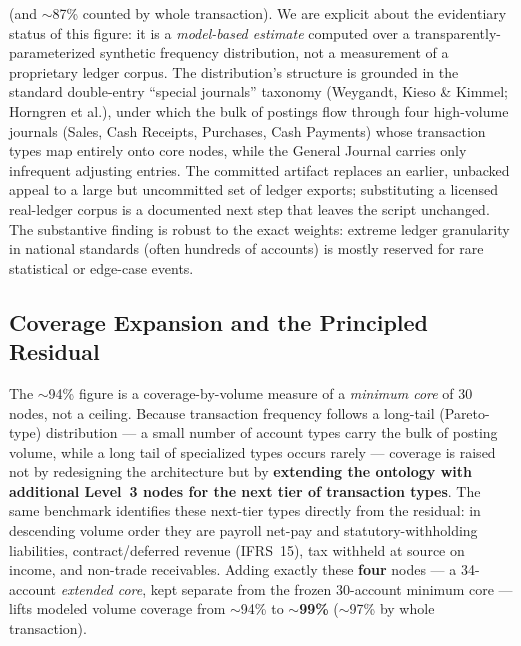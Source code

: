 (and $\sim$87\% counted by whole transaction). We are explicit about the
evidentiary status of this figure: it is a \emph{model-based estimate} computed
over a transparently-parameterized synthetic frequency distribution, not a
measurement of a proprietary ledger corpus. The distribution's structure is
grounded in the standard double-entry ``special journals'' taxonomy (Weygandt,
Kieso \& Kimmel; Horngren et al.), under which the bulk of postings flow through
four high-volume journals (Sales, Cash Receipts, Purchases, Cash Payments) whose
transaction types map entirely onto core nodes, while the General Journal carries
only infrequent adjusting entries. The committed artifact replaces an earlier,
unbacked appeal to a large but uncommitted set of ledger exports; substituting a
licensed real-ledger corpus is a documented next step that leaves the script
unchanged.
The substantive finding is robust to the exact weights: extreme ledger
granularity in national standards (often hundreds of accounts) is mostly reserved
for rare statistical or edge-case events.

\subsection{Coverage Expansion and the Principled Residual}
\label{subsec:coverage_expansion}

The $\sim$94\% figure is a coverage-by-volume measure of a \emph{minimum core}
of 30 nodes, not a ceiling. Because transaction frequency follows a long-tail
(Pareto-type) distribution --- a small number of account types carry the bulk
of posting volume, while a long tail of specialized types occurs rarely ---
coverage is raised not by redesigning the architecture but by \textbf{extending
the ontology with additional Level~3 nodes for the next tier of transaction
types}. The same benchmark identifies these next-tier types directly from the
residual: in descending volume order they are payroll net-pay and
statutory-withholding liabilities, contract/deferred revenue (IFRS~15), tax
withheld at source on income, and non-trade receivables. Adding exactly these
\textbf{four} nodes --- a 34-account \emph{extended core}, kept separate from the
frozen 30-account minimum core --- lifts modeled volume coverage from
$\sim$94\% to \textbf{$\sim$99\%} ($\sim$97\% by whole transaction).

